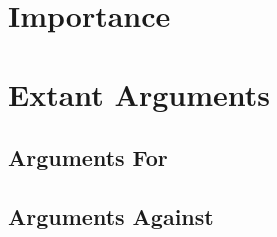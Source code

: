 \documentclass[11pt]{article}
\begin{document}
\begin{multicols}{2}
\section{Importance}

\section{Extant Arguments} 



\subsection{Arguments For}



\subsection{Arguments Against}





\end{multicols}
\end{document}
